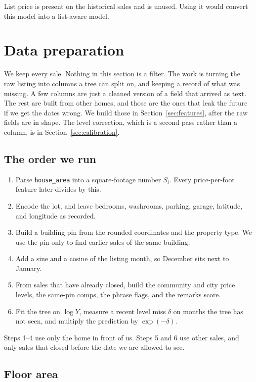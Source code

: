 \documentclass[11pt]{article}
\begin{document}
List price is present on the historical sales and is unused. Using it would convert this model into a list-aware model.

\section{Data preparation}
\label{sec:clean}

We keep every sale. Nothing in this section is a filter. The work is turning the raw listing into columns a tree can split on, and keeping a record of what was missing. A few columns are just a cleaned version of a field that arrived as text. The rest are built from other homes, and those are the ones that leak the future if we get the dates wrong. We build those in Section~\ref{sec:features}, after the raw fields are in shape. The level correction, which is a second pass rather than a column, is in Section~\ref{sec:calibration}.

\subsection{The order we run}

\begin{enumerate}
\item Parse \texttt{house\_area} into a square-footage number \(S_i\). Every price-per-foot feature later divides by this.
\item Encode the lot, and leave bedrooms, washrooms, parking, garage, latitude, and longitude as recorded.
\item Build a building pin from the rounded coordinates and the property type. We use the pin only to find earlier sales of the same building.
\item Add a sine and a cosine of the listing month, so December sits next to January.
\item From sales that have already closed, build the community and city price levels, the same-pin comps, the phrase flags, and the remarks score.
\item Fit the tree on \(\log Y\), measure a recent level miss \(\delta\) on months the tree has not seen, and multiply the prediction by \(\exp(-\delta)\).
\end{enumerate}

Steps 1--4 use only the home in front of us. Steps 5 and 6 use other sales, and only sales that closed before the date we are allowed to see.

\subsection{Floor area}
\end{document}
